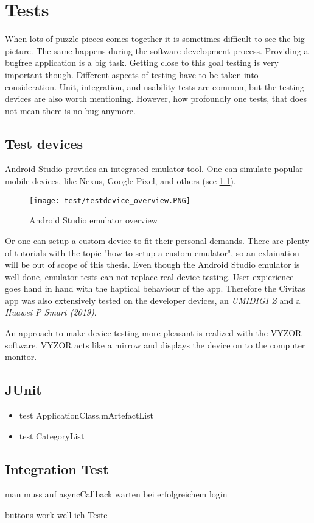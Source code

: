 \newpage
\chapter{Tests}\label{cap:Tests}


When lots of puzzle pieces comes together it is sometimes difficult to see the big picture. The same happens during the software development process. Providing a bugfree application is a big task. Getting close to this goal testing is very important though. Different aspects of testing have to be taken into consideration. Unit, integration, and usability tests are common, but the testing devices are also worth mentioning. However, how profoundly one tests, that does not mean there is no bug anymore.

\section{Test devices}
Android Studio provides an integrated emulator tool. One can simulate popular mobile devices, like Nexus, Google Pixel, and others (see \ref{fig:testdevice_overview}).

\begin{figure}[H]
	\centering \texttt{[image: test/testdevice\_overview.PNG]}
	\caption[Android Studio emulator overview]{Android Studio emulator overview}
	\label{fig:testdevice_overview}
\end{figure}

Or one can setup a custom device to fit their personal demands. There are plenty of tutorials with the topic "how to setup a custom emulator", so an exlaination will be out of scope of this thesis. 
Even though the Android Studio emulator is well done, emulator tests can not replace real device testing.
User expierience goes hand in hand with the haptical behaviour of the app. Therefore the Civitas app was also extensively tested on the developer devices, an \textit{UMIDIGI Z} and a \textit{Huawei P Smart (2019)}. 

An approach to make device testing more pleasant is realized with the VYZOR software. VYZOR acts like a mirrow and displays the device on to the computer monitor.  


\section{JUnit}
\begin{itemize}
\item test ApplicationClass.mArtefactList
\item test CategoryList 
\end{itemize}

\section{Integration Test}
man muss auf asyncCallback warten
bei erfolgreichem login


buttons work well
ich Teste